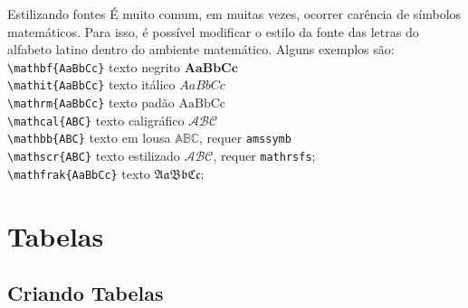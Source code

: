 \documentclass[c]{beamer}
\begin{document}
{\begin{frame}[fragile]{\sc Estilizando fontes}
É muito comum, em muitas vezes, ocorrer {\color{blue} carência de símbolos} matemáticos. 
Para isso, é possível modificar o {\color{blue} estilo da fonte} 
das letras do alfabeto latino dentro do ambiente matemático. Alguns exemplos são:\\[0.5cm]
\verb|\mathbf{AaBbCc}| texto negrito $\mathbf{AaBbCc}$\\
\verb|\mathit{AaBbCc}| texto itálico $\mathit{AaBbCc}$\\
\verb|\mathrm{AaBbCc}| texto padão $\mathrm{AaBbCc}$\\
\verb|\mathcal{ABC}| texto caligráfico $\mathcal{ABC}$\\
\verb|\mathbb{ABC}| texto em lousa $\mathbb{ABC}$, requer \verb|amssymb| \\
\verb|\mathscr{ABC}| texto estilizado $\mathscr{ABC}$, requer \verb|mathrsfs|;\\
\verb|\mathfrak{AaBbCc}| texto $\mathfrak{AaBbCc}$;

\end{frame}	


\section{Tabelas}
\subsection{Criando Tabelas}

}
\end{document}
